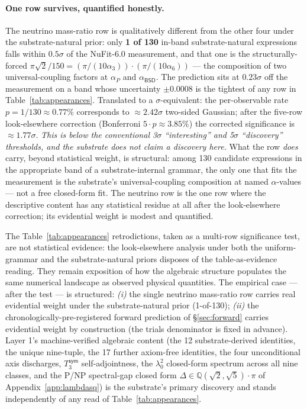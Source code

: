 \documentclass[11pt,a4paper]{amsart}
\theoremstyle{plain}
\theoremstyle{definition}
\begin{document}
\paragraph{One row survives, quantified honestly.} The neutrino mass-ratio row is qualitatively different from the other four under the substrate-natural prior: only \textbf{1 of 130} in-band substrate-natural expressions falls within $0.5\sigma$ of the NuFit-6.0 measurement, and that one is the structurally-forced $\pi\sqrt{2}/150 = (\pi/(10\alpha_3)) \cdot (\pi/(10\alpha_6))$ --- the composition of two universal-coupling factors at $\alpha_P$ and $\alpha_{\textsf{BSD}}$. The prediction sits at $0.23\sigma$ off the measurement on a band whose uncertainty $\pm 0.0008$ is the tightest of any row in Table~\ref{tab:appearances}. Translated to a $\sigma$-equivalent: the per-observable rate $p = 1/130 \approx 0.77\%$ corresponds to $\approx 2.42\sigma$ two-sided Gaussian; after the five-row look-elsewhere correction (Bonferroni $5 \cdot p \approx 3.85\%$) the corrected significance is $\approx 1.77\sigma$. \emph{This is below the conventional 3$\sigma$ ``interesting'' and 5$\sigma$ ``discovery'' thresholds, and the substrate does not claim a discovery here.} What the row \emph{does} carry, beyond statistical weight, is structural: among 130 candidate expressions in the appropriate band of a substrate-internal grammar, the only one that fits the measurement is the substrate's universal-coupling composition at named $\alpha$-values --- not a free closed-form fit. The neutrino row is the one row where the descriptive content has any statistical residue at all after the look-elsewhere correction; its evidential weight is modest and quantified.

The Table~\ref{tab:appearances} retrodictions, taken as a multi-row significance test, are not statistical evidence: the look-elsewhere analysis under both the uniform-grammar and the substrate-natural priors disposes of the table-as-evidence reading. They remain exposition of how the algebraic structure populates the same numerical landscape as observed physical quantities. The empirical case --- after the test --- is structured: \emph{(i)} the single neutrino mass-ratio row carries real evidential weight under the substrate-natural prior (1-of-130); \emph{(ii)} the chronologically-pre-registered forward prediction of \S\ref{sec:forward} carries evidential weight by construction (the trials denominator is fixed in advance). Layer 1's machine-verified algebraic content (the 12 substrate-derived identities, the unique nine-tuple, the 17 further axiom-free identities, the four unconditional axis discharges, $T_3^{\textsf{sym}}$ self-adjointness, the $\lambda_0^2$ closed-form spectrum across all nine classes, and the P/NP spectral-gap closed form $\Delta \in \mathbb{Q}(\sqrt{2}, \sqrt{5})\cdot\pi$ of Appendix~\ref{app:lambdasq}) is the substrate's primary discovery and stands independently of any read of Table~\ref{tab:appearances}.
\end{document}
